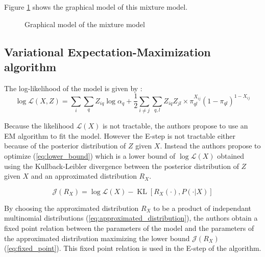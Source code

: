 \documentclass[10pt]{article}
\DeclareMathOperator*{\KL}{KL}
\begin{document}
Figure \ref{fig:graphical_model} shows the graphical model of this mixture model.

\begin{figure}[H]
    \centering
    \label{fig:graphical_model}
    \caption{Graphical model of the mixture model}
\end{figure}


\subsection{Variational Expectation-Maximization algorithm}

The log-likelihood of the model is given by :
\begin{equation}
    \log \mathcal{L}(X, Z) = \sum_{i}\sum_{q} Z_{iq}\log\alpha_q + \frac{1}{2}\sum_{i\neq j}\sum_{q,l} Z_{iq}Z_{jl} \times \pi_{ql}^{X_{ij}}(1-\pi_{ql})^{1-X_{ij}}
\end{equation}

Because the likelihood $\mathcal{L}(X)$ is not tractable, the authors propose to use an EM algorithm to fit the model. However the E-step is not tractable either because of the posterior distribution of $Z$ given $X$. Instead the authors propose to optimize (\ref{eq:lower_bound}) which is a lower bound of $\log\mathcal{L}(X)$ obtained using the Kullback-Leibler divergence between the posterior distribution of $Z$ given $X$ and an approximated distribution $R_X$.

\begin{equation}
    \label{eq:lower_bound}
    \mathcal{J}(R_X)=\log \mathcal{L}(X)-\KL[R_X(\cdot), P(\cdot|X)]
\end{equation}

By choosing the approximated distribution $R_X$ to be a product of independant multinomial distributions (\ref{eq:approximated_distribution}), the authors obtain a fixed point relation between the parameters of the model and the parameters of the approximated distribution maximizing the lower bound $\mathcal{J}(R_X)$ (\ref{eq:fixed_point}). This fixed point relation is used in the E-step of the algorithm.
\end{document}
